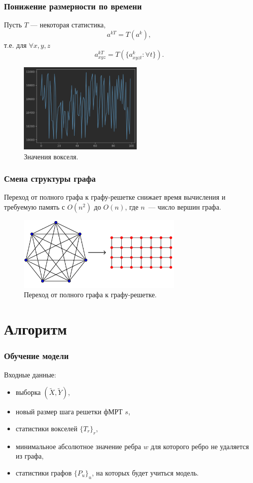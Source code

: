 \documentclass{beamer}
\begin{document}
	\begin{frame} 
		\frametitle{Понижение размерности по времени}
		Пусть $T$ --- некоторая статистика,
		\[
		a^{kT} = T(a^k),
		\]
		т.е. для $\forall x, y, z$
		\[
		a^{kT}_{xyz} = T(\{a_{xyzt}^k : \forall t\}).
		\]
		
		\begin{figure}
			\includegraphics[width=6cm]{../images/time_series.png}
			\caption{Значения вокселя.} 
			\label{fg:11}
		\end{figure}	
	\end{frame}	

	\begin{frame} 
		\frametitle{Смена структуры графа}
		
		Переход от полного графа к графу-решетке снижает время вычисления и требуемую память с $O(n^2)$ до $O(n)$, где $n$~--- число вершин графа.
		
		\vspace{0.5cm}
						
		\begin{figure}
			\includegraphics[width=8cm]{../images/full_grid_graphs_1.pdf}
			\caption{Переход от полного графа к графу-решетке.} 
			\label{fg:9}
		\end{figure}			
	\end{frame}	

	\section{Алгоритм}
	\begin{frame} 
		\frametitle{Обучение модели}
		Входные данные:
		\begin{itemize}
			\item выборка $(\widetilde{X}, \widetilde{Y})$,
			\item новый размер шага решетки фМРТ $s$,
			\item статистики вокселей $\{T_r\}_r$,
			\item минимальное абсолютное значение ребра $w$ для которого ребро не удаляется из графа,
			\item статистики графов $\{P_u\}_u$, на которых будет учиться модель.
		\end{itemize}
	\end{frame}
\end{document}
